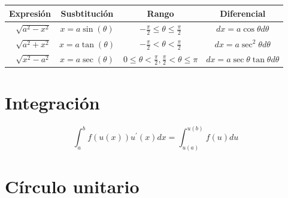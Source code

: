\documentclass[twoside,landscape,letterpaper,twocolumn,13pt]{book}
\begin{document}
\begin{table}[h]
\begin{center}
\begin{tabular}{| r | c | c | c|}
\hline
Expresión & Susbtitución & Rango & Diferencial \\
\hline
$\sqrt{a^{2} - x^{2}}$ & $x = a \sin(\theta)$ & $-\frac{\pi}{2} \leq \theta \leq \frac{\pi}{2} $ & $dx = a \cos{\theta} d\theta$\\
 \hline
 $\sqrt{a^{2} + x^{2}}$ & $x = a \tan(\theta)$ & $-\frac{\pi}{2} < \theta < \frac{\pi}{2} $ & $dx = a \sec^{2}{\theta} d\theta$\\
 \hline
 $\sqrt{x^{2} -  a^{2}}$ & $x = a \sec(\theta)$ & $0 \leq \theta < \frac{\pi}{2}, \frac{\pi}{2} < \theta \leq \pi $ & $dx = a \sec{\theta}\tan{\theta} d\theta$\\
 \hline
\end{tabular}

\end{center}
\end{table}


\section*{Integración }

\begin{equation*}
    \displaystyle{\int_{a}^{b} f(u(x))u^{'}(x) dx = \int_{u(a)}^{u(b)} f(u)du  }
\end{equation*}


\section*{Círculo unitario}
\end{document}
